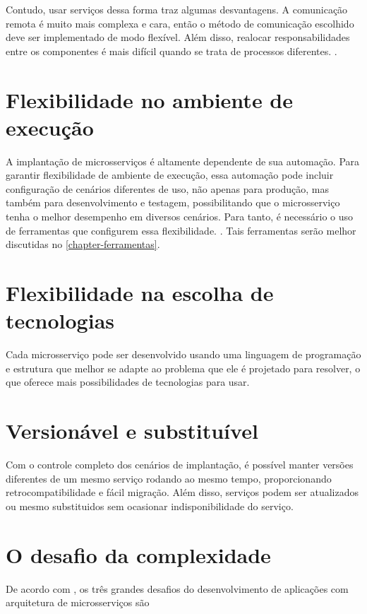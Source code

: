 Contudo, usar serviços dessa forma traz algumas desvantagens. A comunicação remota é muito mais complexa e cara, então o método de comunicação escolhido deve ser implementado de modo flexível. Além disso, realocar responsabilidades entre os componentes é mais difícil quando se trata de processos diferentes. \cite{MartinFowlerMicroservices}.

\section{Flexibilidade no ambiente de execução}

A implantação de microsserviços é altamente dependente de sua automação. Para garantir flexibilidade de ambiente de execução, essa automação pode incluir configuração de cenários diferentes de uso, não apenas para produção, mas também para desenvolvimento e testagem, possibilitando que o microsserviço tenha o melhor desempenho em diversos cenários. Para tanto, é necessário o uso de ferramentas que configurem essa flexibilidade. \cite{Familiar2015}. Tais ferramentas serão melhor discutidas no \autoref{chapter-ferramentas}.

\section{Flexibilidade na escolha de tecnologias}

Cada microsserviço pode ser desenvolvido usando uma linguagem de programação e estrutura que melhor se adapte ao problema que ele é projetado para resolver, o que oferece mais possibilidades de tecnologias para usar. \cite{oracle_microservices}

\section{Versionável e substituível}

Com o controle completo dos cenários de implantação, é possível manter versões diferentes de um mesmo serviço rodando ao mesmo tempo, proporcionando retrocompatibilidade e fácil migração. Além disso, serviços podem ser atualizados ou mesmo substituidos sem ocasionar indisponibilidade do serviço. \cite{Familiar2015}


\section{O desafio da complexidade}

De acordo com , os três grandes desafios do desenvolvimento de aplicações com arquitetura de microsserviços são

